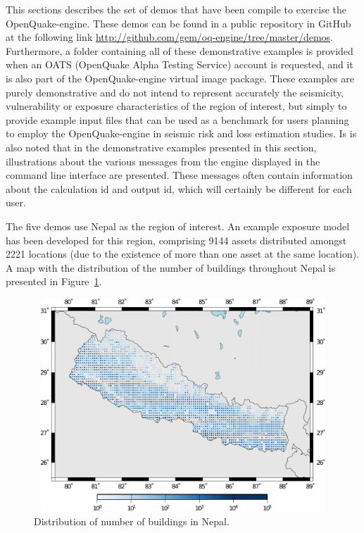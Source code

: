 This sections describes the set of demos that have been compile to exercise the OpenQuake-engine. These demos can be found in a public repository in GitHub at the following link \href{http://github.com/gem/oq-engine/tree/master/demos}{http://github.com/gem/oq-engine/tree/master/demos}. Furthermore, a folder containing all of these demonstrative examples is provided when an OATS (OpenQuake Alpha Testing Service) account is requested, and it is also part of the OpenQuake-engine virtual image package. These examples are purely demonstrative and do not intend to represent accurately the seismicity, vulnerability or exposure characteristics of the region of interest, but simply to provide example input files that can be used as a benchmark for users planning to employ the OpenQuake-engine in seismic risk and loss estimation studies. Is is also noted that in the demonstrative examples presented in this section, illustrations about the various messages from the engine displayed in the command line interface are presented. These messages often contain information about the calculation id and output id, which will certainly be different for each user.

The five demos use Nepal as the region of interest. An example \gls{exposure model} has been developed for this region, comprising 9144 assets distributed amongst 2221 locations (due to the existence of more than one \gls{asset} at the same location). A map with the distribution of the number of buildings throughout Nepal is presented in Figure~\ref{fig:expNepal}.

\begin{figure}[ht]
\centering
\includegraphics[width=12cm,height=8cm]{figures/risk/NepalExposure.pdf}
\caption{Distribution of number of buildings in Nepal.}
\label{fig:expNepal}
\end{figure}

